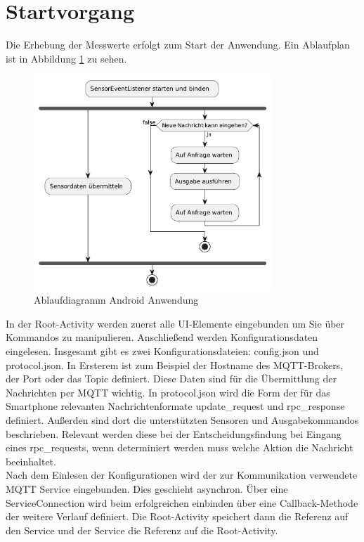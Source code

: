 \documentclass[11pt,a4paper]{report}
\begin{document}
\section{Startvorgang}
Die Erhebung der Messwerte erfolgt zum Start der Anwendung.
Ein Ablaufplan ist in Abbildung \ref{fig:app_flow} zu sehen.
\begin{figure}[htbp]
  \centering
  \includegraphics[width=0.8\textwidth]{images/app_ablauf}
  \caption{Ablaufdiagramm Android Anwendung}
  \label{fig:app_flow}
\end{figure}
In der Root-Activity werden zuerst alle UI-Elemente eingebunden um Sie über Kommandos zu manipulieren.
Anschließend werden Konfigurationsdaten eingelesen.
Insgesamt gibt es zwei Konfigurationsdateien: config.json und protocol.json.
In Ersterem ist zum Beispiel der Hostname des MQTT-Brokers, der Port oder das Topic definiert.
Diese Daten sind für die Übermittlung der Nachrichten per MQTT wichtig.
In protocol.json wird die Form der für das Smartphone relevanten Nachrichtenformate update\_request und rpc\_response definiert.
Außerden sind dort die unterstützten Sensoren und Ausgabekommandos beschrieben.
Relevant werden diese bei der Entscheidungsfindung bei Eingang eines rpc\_requests, wenn determiniert werden muss welche Aktion die Nachricht beeinhaltet.
\\
Nach dem Einlesen der Konfigurationen wird der zur Kommunikation verwendete MQTT Service eingebunden.
Dies geschieht asynchron.
Über eine ServiceConnection wird beim erfolgreichen einbinden über eine Callback-Methode der weitere Verlauf definiert.
Die Root-Activity speichert dann die Referenz auf den Service und der Service die Referenz auf die Root-Activity.
\end{document}
